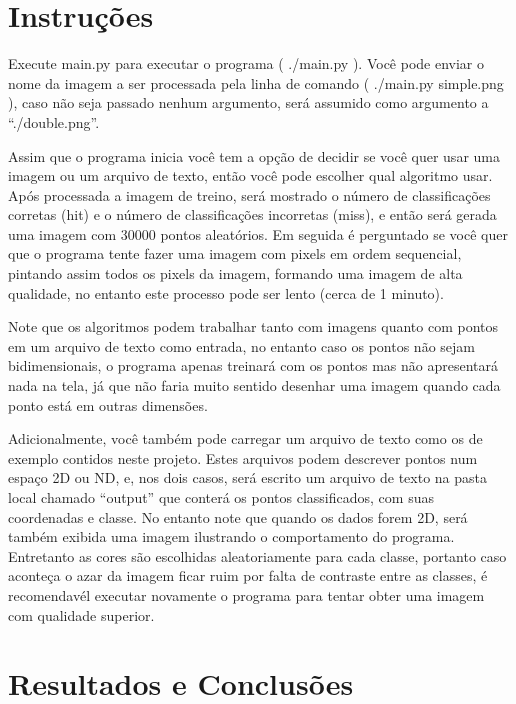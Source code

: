 \documentclass[12pt]{article}
\author{Bruno Farias de Loreto}
\begin{document}
\section{Instruções}

Execute main.py para executar o programa ( ./main.py ).
Você pode enviar o nome da imagem a ser processada pela linha de comando ( ./main.py simple.png ), caso
não seja passado nenhum argumento, será assumido como argumento a ``./double.png''.

Assim que o programa inicia você tem a opção de decidir se você quer usar uma imagem ou um arquivo de texto, então você pode escolher qual algoritmo usar. Após processada a imagem de treino, será mostrado o número de classificações corretas (hit) e o número de classificações incorretas (miss), e então será gerada uma imagem com 30000 pontos aleatórios. Em seguida é perguntado se você quer que o programa tente fazer uma imagem com pixels em ordem sequencial, pintando assim todos os pixels da imagem, formando uma imagem de alta qualidade, no entanto este processo pode ser lento (cerca de 1 minuto).

Note que os algoritmos podem trabalhar tanto com imagens quanto com pontos em um arquivo de texto como entrada, no entanto caso os pontos não sejam bidimensionais, o programa apenas treinará com os pontos mas não apresentará nada na tela, já que não faria muito sentido desenhar uma imagem quando cada ponto está em outras dimensões.

Adicionalmente, você também pode carregar um arquivo de texto como os de exemplo contidos neste projeto.
Estes arquivos podem descrever pontos num espaço 2D ou ND, e, nos dois casos, será escrito um arquivo de texto na pasta local chamado ``output'' que conterá os pontos classificados, com suas coordenadas e classe. No entanto note que quando os dados forem 2D, será também exibida uma imagem ilustrando o comportamento do programa. Entretanto as cores são escolhidas aleatoriamente para cada classe, portanto caso aconteça o azar da imagem ficar ruim por falta de contraste entre as classes, é recomendavél executar novamente o programa para tentar obter uma imagem com qualidade superior.

\section{Resultados e Conclusões}
\end{document}

